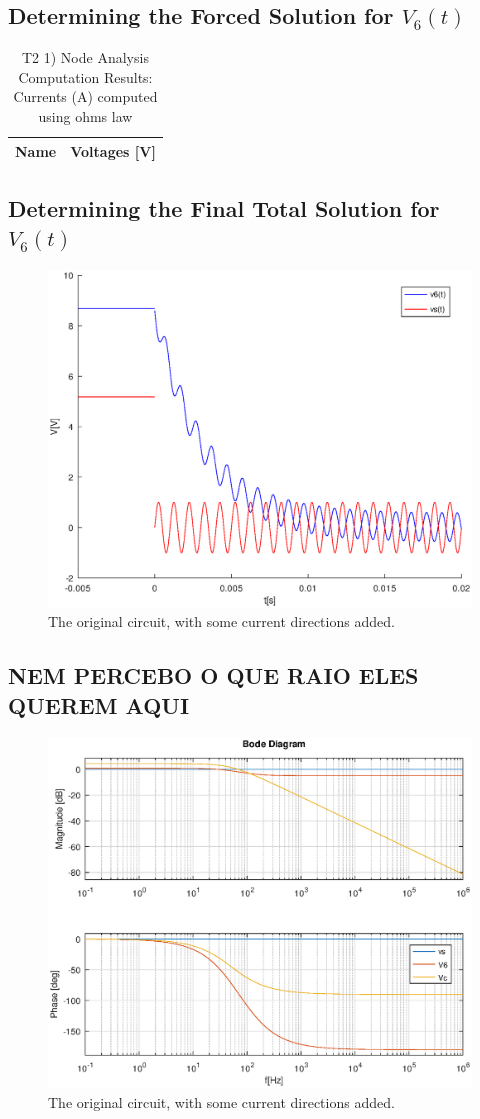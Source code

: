 \subsection{Determining the Forced Solution for $V_6(t)$}

\begin{table}[h]
  \centering
  \begin{tabular}{|l|r|}
    \hline    
    {\bf Name} & {\bf Voltages [V]} \\ \hline
    
  \end{tabular}
  \caption{T2 1) Node Analysis Computation Results: Currents (A) computed using ohms law}
  \label{tab:nodeVoltages2}
\end{table}

\subsection{Determining the Final Total Solution for $V_6(t)$}

\begin{figure}[h] \centering
\includegraphics[width=0.4\linewidth]{t2-t5.eps}
\caption{The original circuit, with some current directions added.}
\label{cfergter}
\end{figure}


\subsection{NEM PERCEBO O QUE RAIO ELES QUEREM AQUI}

\begin{figure}[h] \centering
\includegraphics[width=0.4\linewidth]{t2-t6.eps}
\caption{The original circuit, with some current directions added.}
\label{cfergter}
\end{figure}
